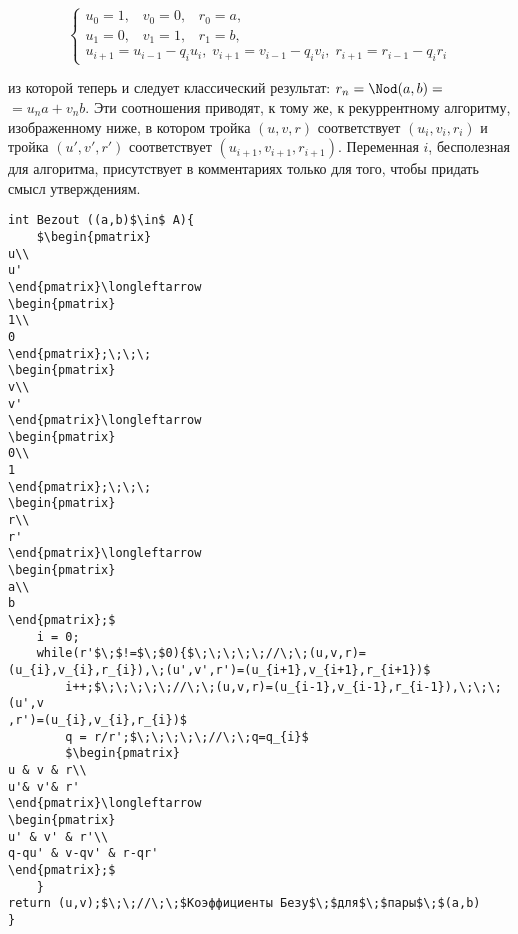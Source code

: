 $$\left\lbrace\begin{array}{l}
u_{0}=1,\;\;\;v_{0}=0,\;\;\;r_{0}=a,\\
u_{1}=0,\;\;\;v_{1}=1,\;\;\;r_{1}=b,\\
u_{i+1}=u_{i-1}-q_{i}u_{i},\;v_{i+1}=v_{i-1}-q_{i}v_{i},\;r_{i+1}=r_{i-1}-q_{i}r_{i}
\end{array}\right.$$

\noindent из которой теперь и следует классический результат: $r_{n} = \Nod(a, b) =$\linebreak
$=u_{n}a+v_{n}b$. Эти соотношения приводят, к тому же, к рекуррентному
алгоритму, изображенному ниже, в котором тройка $(u,v,r)$ соответ­ствует $(u_{i}, v_{i}, r_{i})$ и тройка $(u', v', r')$ соответствует $(u_{i+1},v_{i+1},r_{i+1})$. Переменная $i$, бесполезная для алгоритма, присутствует в комментариях
только для того, чтобы придать смысл утверждениям.
\begin{leftbar}
\begin{lstlisting}[frame=none,mathescape=true]
int Bezout ((a,b)$\in$ A){
	$\begin{pmatrix}
u\\
u'
\end{pmatrix}\longleftarrow
\begin{pmatrix}
1\\
0
\end{pmatrix};\;\;\;
\begin{pmatrix}
v\\
v'
\end{pmatrix}\longleftarrow
\begin{pmatrix}
0\\
1
\end{pmatrix};\;\;\;
\begin{pmatrix}
r\\
r'
\end{pmatrix}\longleftarrow
\begin{pmatrix}
a\\
b
\end{pmatrix};$
	i = 0;
	while(r'$\;$!=$\;$0){$\;\;\;\;\;//\;\;(u,v,r)=(u_{i},v_{i},r_{i}),\;(u',v',r')=(u_{i+1},v_{i+1},r_{i+1})$
		i++;$\;\;\;\;\;//\;\;(u,v,r)=(u_{i-1},v_{i-1},r_{i-1}),\;\;\;(u',v
,r')=(u_{i},v_{i},r_{i})$
		q = r/r';$\;\;\;\;\;//\;\;q=q_{i}$
		$\begin{pmatrix}
u & v & r\\
u'& v'& r'
\end{pmatrix}\longleftarrow
\begin{pmatrix}
u' & v' & r'\\
q-qu' & v-qv' & r-qr'
\end{pmatrix};$
	}
return (u,v);$\;\;//\;\;$Коэффициенты Безу$\;$для$\;$пары$\;$(a,b)
}
\end{lstlisting}
\end{leftbar}
